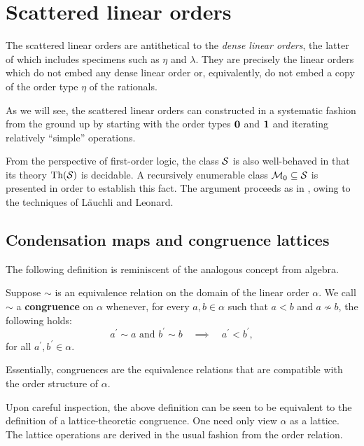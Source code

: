 

\chapter{Scattered linear orders}

The scattered linear orders are antithetical to the \textit{dense linear
orders}, the latter of which includes specimens such as $\eta$ and $\lambda$.
They are precisely the linear orders which do not embed any dense linear order
or, equivalently, do not embed a copy of the order type $\eta$ of the
rationals.

As we will see, the scattered linear orders can constructed in a systematic
fashion from the ground up by starting with the order types $\mathbf{0}$ and $\mathbf{1}$
and iterating relatively ``simple'' operations.

From the perspective of first-order logic, the class $\mathcal{S}$ is also
well-behaved in that its theory $\operatorname{Th}(\mathcal{S})$ is decidable.  A recursively
enumerable class $\mathcal{M}_0\subseteq\mathcal{S}$ is presented in order to establish
this fact.  The argument proceeds as in \cite{RosLin}, owing to the techniques
of L\"auchli and Leonard.

\section{Condensation maps and congruence lattices}

The following definition is reminiscent of the analogous concept from algebra.

\begin{dfn}[Congruence]
	Suppose $\sim$ is an equivalence relation on the domain of the linear order
	$\alpha$.  We call $\sim$ a \textbf{congruence} on $\alpha$ whenever, for
	every $a,b\in\alpha$ such that $a<b$ and $a\nsim b$, the following
	holds:
	\begin{equation}
		a^\prime\sim a\text{ and }b^\prime\sim b\quad\implies\quad
		a^\prime<b^\prime,
	\end{equation}
	for all $a^\prime,b^\prime\in\alpha$.
\end{dfn}

Essentially, congruences are the equivalence relations that are compatible with
the order structure of $\alpha$.

Upon careful inspection, the above definition can be seen to be equivalent to
the definition of a lattice-theoretic congruence.  One need only view $\alpha$
as a lattice.  The lattice operations are derived in the usual fashion from the
order relation.

